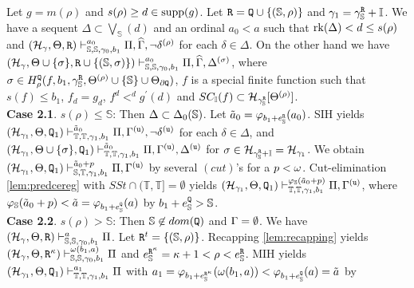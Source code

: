 \documentclass{article}
\newcommand{\mS}{\mathbb{S}}
\newcommand{\mI}{\mathbb{I}}
\newcommand{\mT}{\mathbb{T}}
\begin{document}
Let 
$g=m(\rho)$ and $s(\rho)\geq d\in {\rm supp}(g)$.
Let ${\tt R}={\tt Q}\cup\{(\mS,\rho)\}$ and $\gam_{1}=\gam_{\mS}^{{\tt R}}+\mI$.
We have a sequent $\Delta\subset\bigvee_{\mS}(d)$
and an ordinal $a_{0}<a$ such that 
${\rm rk}(\Delta)<d\leq s(\rho)$ and
$
(\mathcal{H}_{\gamma},\Theta,
{\tt R}
)
\vdash^{a_{0}}_{\mS,\mS,\gam_{0},b_{1}}
\Pi,\widehat{\Gam},
\lnot\delta^{(\rho)}
$
for each $\delta\in\Delta$.
On the other hand we have 
$
(\mathcal{H}_{\gamma},\Theta\cup\{\sig\},
{\tt R}\cup\{(\mS,\sigma)\}
)
\vdash^{a_{0}}_{\mS,\mS,\gam_{0},b_{1}}
\Pi, \widehat{\Gam},\Delta^{(\sigma)}
$, where
$\sigma\in H^{{\tt Q}}_{\rho}(f,b_{1},\gamma_{\mS}^{{\tt R}},\Theta^{(\rho)}\cup\{\mS\}\cup\Tht_{\partial{\tt Q}})$,
$f$ is a special finite function such that $s(f)\leq b_{1}$,
$f_{d}=g_{d}$, $f^{d}<^{d}g^{\prime}(d)$ and
$SC_{\mI}(f)\subset\mathcal{H}_{\gamma_{\mS}^{{\tt R}}}[\Theta^{(\rho)}]$.
\\
\textbf{Case 2.1}. $s(\rho)\leq\mS$: Then $\Del\subset\Del_{0}(\mS)$.
Let $\tilde{a}_{0}=\vphi_{b_{1}+e^{{\tt R}}_{\mS}}(a_{0})$.
SIH yields $
(\mathcal{H}_{\gamma_{1}},\Theta,
{\tt Q}_{1}
)
\vdash^{\tilde{a}_{0}}_{\mT,\mT,\gam_{1},b_{1}}
\Pi,\Gam^{({\tt u})},
\lnot\delta^{({\tt u})}
$
for each $\delta\in\Delta$, and
$
(\mathcal{H}_{\gamma_{1}},\Theta\cup\{\sig\},
{\tt Q}_{1}
)
\vdash^{\tilde{a}_{0}}_{\mT,\mT,\gam_{1},b_{1}}
\Pi, \Gam^{({\tt u})},\Delta^{({\tt u})}
$ for $\sig\in\calh_{\gam_{\mS}^{{\tt R}}+\mI}=\calh_{\gam_{1}}$.
We obtain
$
(\mathcal{H}_{\gamma_{1}},\Theta,
{\tt Q}_{1}
)
\vdash^{\tilde{a}_{0}+p}_{\mS,\mT,\gam_{1},b_{1}}
\Pi,\Gam^{({\tt u})}
$ by several $(cut)$'s for a $p<\omega$.
Cut-elimination \ref{lem:predcereg} with $SSt\cap(\mT,\mT]=\emptyset$ yields
$
(\mathcal{H}_{\gamma_{1}},\Theta,
{\tt Q}_{1}
)
\vdash^{\vphi_{\mS}(\tilde{a}_{0}+p)}_{\mT,\mT,\gam_{1},b_{1}}
\Pi,\Gam^{({\tt u})}
$,
where $\vphi_{\mS}(\tilde{a}_{0}+p)<\tilde{a}=\vphi_{b_{1}+e^{{\tt Q}}_{\mS}}(a)$ by $b_{1}+e_{\mS}^{{\tt Q}}>\mS$.
\\
\textbf{Case 2.2}. $s(\rho)>\mS$: Then $\mS\not\in dom({\tt Q})$ and $\Gamma=\emptyset$.
We have
$
(\mathcal{H}_{\gamma},\Theta,{\tt R})
\vdash^{a}_{\mS,\mS,\gam_{0},b_{1}}
\Pi
$.
Let ${\tt R}^{t}=\{(\mS,\rho)\}$.
Recapping \ref{lem:recapping} yields
$
(\mathcal{H}_{\gamma},\Theta,{\tt R}^{\kap})
\vdash^{\ome(b_{1},a)}_{\mS,\mS,\gam_{0},b_{1}}
\Pi
$ and $e^{{\tt R}^{\kap}}_{\mS}=\kap+1<\rho<e^{{\tt R}}_{\mS}$.
MIH yields
$
(\mathcal{H}_{\gamma_{1}},\Theta,{\tt Q}_{1})
\vdash^{a_{1}}_{\mT,\mT,\gam_{1},b_{1}}
\Pi
$ with
$a_{1}=\vphi_{b_{1}+e^{{\tt R}^{\kap}}_{\mS}}(\ome(b_{1},a))<\vphi_{b_{1}+e^{{\tt Q}}_{\mS}}(a)=\tilde{a}$ by 
\end{document}
